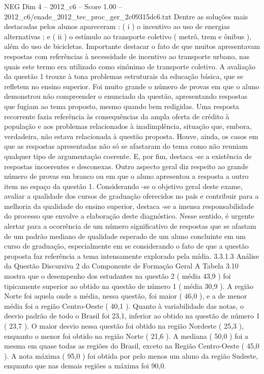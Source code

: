 \begin{textsample}{NEG Dim 4 – 2012\_c6 – Score 1.00 – 2012\_c6/enade\_2012\_tec\_proc\_ger\_2c09315dc6.txt}
Dentre as soluções mais destacadas pelos alunos apareceram : ( i ) o incentivo ao uso de energias alternativas ; e ( ii ) o estímulo ao transporte coletivo ( metrô, trem e ônibus ), além do uso de bicicletas.
Importante destacar o fato de que muitos apresentavam respostas com referências à necessidade de incentivo ao transporte urbano, nas quais este termo era utilizado como sinônimo de transporte coletivo.
A avaliação da questão 1 trouxe à tona problemas estruturais da educação básica, que se refletem no ensino superior.
Foi muito grande o número de provas em que o aluno demonstrou não compreender o enunciado da questão, apresentando respostas que fugiam ao tema proposto, mesmo quando bem redigidas.
Uma resposta recorrente fazia referência às consequências da ampla oferta de crédito à população e aos problemas relacionados à inadimplência, situação que, embora, verdadeira, não estava relacionada à questão proposta.
Houve, ainda, os casos em que as respostas apresentadas não só se afastaram do tema como não reuniam qualquer tipo de argumentação coerente.
E, por fim, destaca -se a existência de respostas incoerentes e desconexas.
Outro aspecto geral diz respeito ao grande número de provas em branco ou em que o aluno apresentou a resposta a outro item no espaço da questão 1.
Considerando -se o objetivo geral deste exame, avaliar a qualidade dos cursos de graduação oferecidos no país e contribuir para a melhoria da qualidade do ensino superior, destaca -se a imensa responsabilidade do processo que envolve a elaboração deste diagnóstico.
Nesse sentido, é urgente alertar para a ocorrência de um número significativo de respostas que se afastam de um padrão mediano de qualidade esperado de um aluno concluinte em um curso de graduação, especialmente em se considerando o fato de que a questão proposta faz referência a tema intensamente explorado pela mídia. 3.3.1.3 Análise da Questão Discursiva 2 do Componente de Formação Geral A Tabela 3.10 mostra que o desempenho dos estudantes na questão 2 ( média 43,9 ) foi tipicamente superior ao obtido na questão de número 1 ( média 30,9 ).
A região Norte foi aquela onde a média, nessa questão, foi maior ( 46,0 ), e a de menor média foi a região Centro-Oeste ( 40,1 ).
Quanto à variabilidade das notas, o desvio padrão de todo o Brasil foi 23,1, inferior ao obtido na questão de número 1 ( 23,7 ).
O maior desvio nessa questão foi obtido na região Nordeste ( 25,3 ), enquanto o menor foi obtido na região Norte ( 21,6 ).
A mediana ( 50,0 ) foi a mesma em quase todas as regiões do Brasil, exceto na Região Centro-Oeste ( 45,0 ).
A nota máxima ( 95,0 ) foi obtida por pelo menos um aluno da região Sudeste, enquanto que nas demais regiões a máxima foi 90,0.

\end{textsample}
